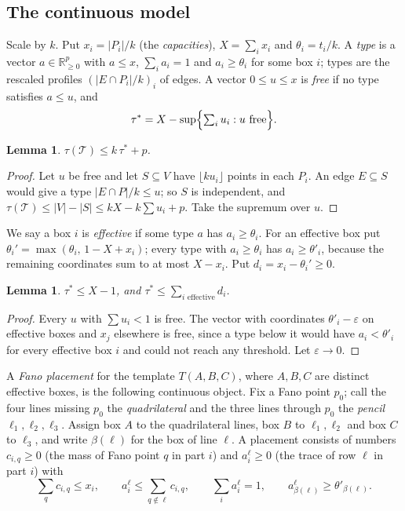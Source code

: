 \documentclass[11pt]{amsart}
\newtheorem{lemma}[theorem]{Lemma}
\theoremstyle{definition}
\theoremstyle{remark}
\begin{document}
\subsection{The continuous model}
Scale by $k$. Put $x_i=|P_i|/k$ (the \emph{capacities}), $X=\sum_ix_i$ and $\theta_i=t_i/k$. A \emph{type} is a vector $a\in\mathbb R^p_{\ge0}$ with $a\le x$, $\sum_ia_i=1$ and $a_i\ge\theta_i$ for some box $i$; types are the rescaled profiles $(|E\cap P_i|/k)_i$ of edges. A vector $0\le u\le x$ is \emph{free} if no type satisfies $a\le u$, and
\[
\tau^*=X-\sup\Bigl\{\textstyle\sum_iu_i: u\text{ free}\Bigr\}.
\]

\begin{lemma}\label{lem:tauint}
$\tau(\mathcal T)\le k\,\tau^*+p$.
\end{lemma}

\begin{proof}
Let $u$ be free and let $S\subseteq V$ have $\lfloor ku_i\rfloor$ points in each $P_i$. An edge $E\subseteq S$ would give a type $|E\cap P|/k\le u$; so $S$ is independent, and $\tau(\mathcal T)\le|V|-|S|\le kX-k\sum u_i+p$. Take the supremum over $u$.
\end{proof}

We say a box $i$ is \emph{effective} if some type $a$ has $a_i\ge\theta_i$. For an effective box put $\theta_i'=\max(\theta_i,\,1-X+x_i)$; every type with $a_i\ge\theta_i$ has $a_i\ge\theta'_i$, because the remaining coordinates sum to at most $X-x_i$. Put $d_i=x_i-\theta_i'\ge0$.

\begin{lemma}\label{lem:freevector}
$\tau^*\le X-1$, and $\tau^*\le\sum_{i\text{ effective}}d_i$.
\end{lemma}

\begin{proof}
Every $u$ with $\sum u_i<1$ is free. The vector with coordinates $\theta'_i-\varepsilon$ on effective boxes and $x_j$ elsewhere is free, since a type below it would have $a_i<\theta'_i$ for every effective box $i$ and could not reach any threshold. Let $\varepsilon\to0$.
\end{proof}

A \emph{Fano placement} for the template $T(A,B,C)$, where $A,B,C$ are distinct effective boxes, is the following continuous object. Fix a Fano point $p_0$; call the four lines missing $p_0$ the \emph{quadrilateral} and the three lines through $p_0$ the \emph{pencil} $\ell_1,\ell_2,\ell_3$. Assign box $A$ to the quadrilateral lines, box $B$ to $\ell_1,\ell_2$ and box $C$ to $\ell_3$, and write $\beta(\ell)$ for the box of line $\ell$. A placement consists of numbers $c_{i,q}\ge0$ (the mass of Fano point $q$ in part $i$) and $a^\ell_i\ge0$ (the trace of row $\ell$ in part $i$) with
\begin{equation}\label{eq:placement}
\sum_qc_{i,q}\le x_i,\qquad a^\ell_i\le\sum_{q\notin\ell}c_{i,q},\qquad\sum_ia^\ell_i=1,\qquad a^\ell_{\beta(\ell)}\ge\theta'_{\beta(\ell)} .
\end{equation}
\end{document}
